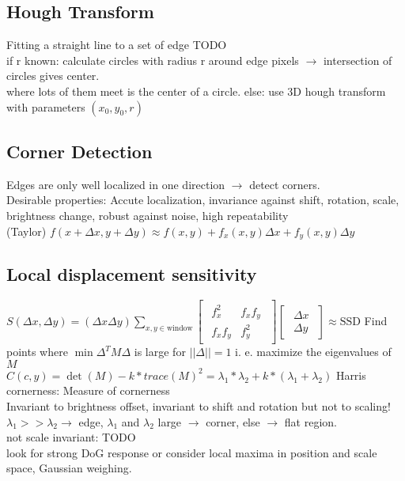 \subsection*{Hough Transform}
Fitting a straight line to a set of edge TODO\\
 if r known: calculate circles with radius r around edge pixels $\rightarrow$ intersection of circles gives center.\\ where lots of them meet is the center of a circle. else: use 3D hough transform with parameters $(x_0, y_0, r)$
\subsection*{Corner Detection}
Edges are only well localized in one direction $\rightarrow$ detect corners.\\
Desirable properties: Accute localization, invariance against shift, rotation, scale, brightness change, robust against noise, high repeatability\\
 (Taylor) $f(x + \Delta x, y + \Delta y) \approx f(x, y) + f_x(x, y) \Delta x + f_y(x, y)\Delta y$
\subsection*{Local displacement sensitivity }
$S (\Delta x, \Delta y) = (\Delta x \Delta y) \sum_{x, y \in \text{window}}
\begin{bmatrix}
    \begin{smallmatrix} 
        f_x^{2} & f_x f_y \\ 
        f_x f_y & f_y^{2} 
    \end{smallmatrix} 
\end{bmatrix}
\begin{bmatrix}
    \begin{smallmatrix} 
        \Delta x \\ 
        \Delta y
    \end{smallmatrix} 
\end{bmatrix} 
\approx \text{SSD}$
Find points where $\min \Delta^T M \Delta$ is large for $||\Delta || = 1$ i. e. maximize the eigenvalues of $M$\\
$C(c, y) = \det(M) - k * trace(M)^{2} = \lambda_1 * \lambda_2 + k * (\lambda_1 + \lambda_2)$ Harris cornerness: Measure of cornerness\\
 Invariant to brightness offset, invariant to shift and rotation but not to scaling!
$\lambda_1 >> \lambda_2 \rightarrow$ edge, $\lambda_1$ and $ \lambda_2$ large $\rightarrow$ corner, else $\rightarrow$ flat region.\\
not scale invariant: TODO\\
 look for strong DoG response or consider local maxima in position and scale space, Gaussian weighing.
